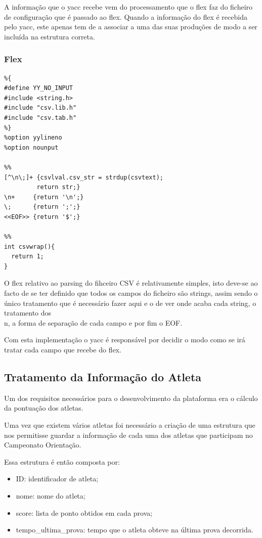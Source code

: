 \documentclass[11pt, a4paper, oneside]{article}
\begin{document}
A informação que o \textsf{yacc} recebe vem do processamento que o \textsf{flex} faz do ficheiro de configuração que é passado ao \textsf{flex}.
Quando a informação do \textsf{flex} é recebida pelo \textsf{yacc}, este apenas tem de a associar a uma das suas produções de modo a ser incluída na estrutura correta.
\newpage
\subsubsection{\textsf{Flex}}

\begin{lstlisting}
%{
#define YY_NO_INPUT
#include <string.h>
#include "csv.lib.h"
#include "csv.tab.h"
%}
%option yylineno
%option nounput

%%
[^\n\;]+ {csvlval.csv_str = strdup(csvtext);
         return str;}
\n+     {return '\n';}
\;      {return ';';}
<<EOF>> {return '$';}

%%
int csvwrap(){
  return 1;
}
\end{lstlisting}

O \textsf{flex} relativo ao parsing do fihceiro CSV é relativamente simples, isto deve-se ao facto de se ter definido que todos os campos do ficheiro são strings, assim sendo o único tratamento que é necessário fazer aqui e o de ver onde acaba cada string, o tratamento dos \\n, a forma de separação de cada campo e por fim o EOF.

Com esta implementação o \textsf{yacc} é responsável por decidir o modo como se irá tratar cada campo que recebe do \textsf{flex}.
 
\newpage
\subsection{Tratamento da Informação do Atleta}

Um dos requisitos necessários para o desenvolvimento da plataforma era o cálculo da pontuação dos atletas. 

Uma vez que existem vários atletas foi necessário a criação de uma estrutura que nos permitisse guardar a informação de cada uma dos atletas que participam no Campeonato Orientação.

Essa estrutura é então composta por:
\begin{itemize}
\item \textsf{ID}: identificador de atleta;
\item \textsf{nome}: nome do atleta;
\item \textsf{score}: lista de ponto obtidos em cada prova;
\item \textsf{tempo\_ultima\_prova}: tempo que o atleta obteve na última prova decorrida.
\end{itemize}
\end{document}
